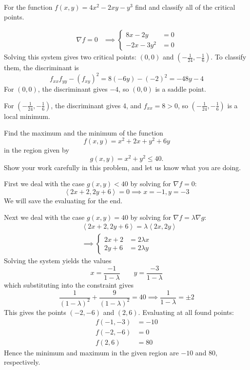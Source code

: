 \documentclass[12pt,answers]{exam}
\newcommand{\vect}[1]{\left\langle #1\right\rangle}
\begin{document}
\begin{questions}
	\newpage
	\question[14]
	For the function $f(x,y) = 4x^2 - 2xy - y^3$ find and classify all of the critical points.
	\begin{solution}
		\begin{align*}
			\nabla f = 0
			&\implies
			\left\{
				\begin{aligned}
					8x-2y &= 0 \\ 
					-2x -3y^2 &= 0
				\end{aligned}
			\right.
		\end{align*}
		Solving this system gives two critical points: 
		$(0,0)$ and $(-\frac1{24}, -\frac16)$.
		To classify them, the discriminant is
		\[
			f_{xx} f_{yy} - (f_{xy})^2 
			= 8(-6y) - (-2)^2 = -48y - 4
		\]
		For $(0,0)$, the discriminant gives $-4$, so $(0,0)$ is a saddle point.

		For $(-\frac1{24}, -\frac16)$, the discriminant gives 4, and $f_{xx} = 8 > 0$, so $(-\frac1{24}, -\frac16)$ is a local minimum.
	\end{solution}

	\newpage
	\question[20]
	Find the maximum and the minimum of the function
	\[
		f(x,y) = x^2 + 2x + y^2 + 6y
	\]
	in the region given by 
	\[
		g(x,y) = x^2 + y^2 \le 40.
	\]
	Show your work carefully in this problem, and let us know what you are doing.
	\begin{solution}
		First we deal with the case $g(x, y) < 40$ by solving for $\nabla f =0$:
		\[
			\vect{2x+2, 2y+6} = 0 \implies x=-1, y=-3
		\]
		We will save the evaluating for the end.

		Next we deal with the case $g(x, y) = 40$ by solving for $\nabla f = \lambda \nabla g$:
		\[
			\begin{aligned}
			&\vect{2x+2, 2y+6} = \lambda \vect{2x, 2y} \\
			& \implies \left\{
				\begin{aligned}
					2x+2 &= 2\lambda x\\
					2y+6 &= 2\lambda y
				\end{aligned}
			\right.
			\end{aligned}
		\]
		Solving the system yields the values
		\[
			x = \frac{-1}{1-\lambda} \qquad y = \frac{-3}{1-\lambda}
		\]
		which substituting into the constraint gives
		\[
			\frac{1}{(1-\lambda)^2} + \frac{9}{(1-\lambda)^2} = 40 \implies \frac{1}{1-\lambda} = \pm 2
		\]
		This gives the points $(-2, -6)$ and $(2, 6)$.
		Evaluating at all found points:
		\begin{align*}
			f(-1, -3) &= -10\\ 
			f(-2, -6) &= 0\\
			f(2, 6) &= 80 
		\end{align*}
		Hence the minimum and maximum in the given region are $-10$ and 80, respectively.
	\end{solution}


\end{questions}
\end{document}
